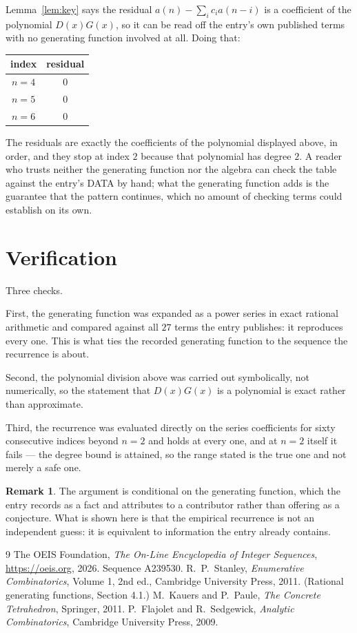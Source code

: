 \documentclass[11pt,a4paper]{article}
\theoremstyle{plain}
\theoremstyle{definition}
\newtheorem{remark}[theorem]{Remark}
\begin{document}
Lemma~\ref{lem:key} says the residual $a(n)-\sum_ic_ia(n-i)$ is a coefficient of the
polynomial $D(x)G(x)$, so it can be read off the entry's own published terms with no
generating function involved at all. Doing that:
\begin{center}
\begin{tabular}{cc}
index & residual \\ \hline
$n=4$ & $0$ \\
$n=5$ & $0$ \\
$n=6$ & $0$
\end{tabular}
\end{center}
The residuals are exactly the coefficients of the polynomial displayed above, in order, and
they stop at index $2$ because that polynomial has degree $2$. A reader who trusts
neither the generating function nor the algebra can check the table against the entry's DATA
by hand; what the generating function adds is the guarantee that the pattern continues, which
no amount of checking terms could establish on its own.

\section{Verification}

Three checks.

First, the generating function was expanded as a power series in exact rational arithmetic and
compared against all $27$ terms the entry publishes: it reproduces every one. This is
what ties the recorded generating function to the sequence the recurrence is about.

Second, the polynomial division above was carried out symbolically, not numerically, so the
statement that $D(x)G(x)$ is a polynomial is exact rather than approximate.

Third, the recurrence was evaluated directly on the series coefficients for sixty consecutive
indices beyond $n=2$ and holds at every one, and at $n=2$ itself it fails --- the
degree bound is attained, so the range stated is the true one and not merely a safe one.

\begin{remark}
The argument is conditional on the generating function, which the entry records as a fact and
attributes to a contributor rather than offering as a conjecture. What is shown here is that
the empirical recurrence is not an independent guess: it is equivalent to information the
entry already contains.
\end{remark}

\begin{thebibliography}{9}
 The OEIS Foundation, \emph{The On-Line Encyclopedia of Integer
Sequences}, \url{https://oeis.org}, 2026. Sequence A239530.
 R.~P.~Stanley, \emph{Enumerative Combinatorics}, Volume 1, 2nd ed.,
Cambridge University Press, 2011. (Rational generating functions, Section 4.1.)
 M.~Kauers and P.~Paule, \emph{The Concrete Tetrahedron}, Springer, 2011.
 P.~Flajolet and R.~Sedgewick, \emph{Analytic Combinatorics}, Cambridge
University Press, 2009.
\end{thebibliography}
\end{document}
